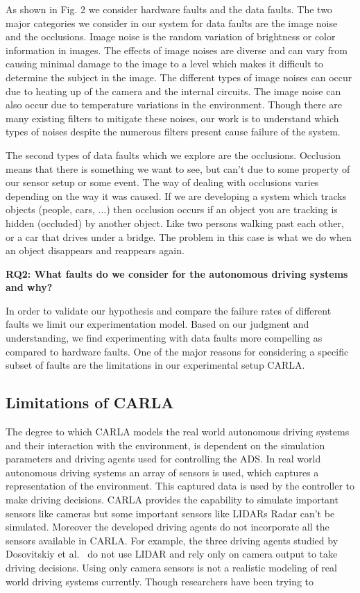 As shown in Fig. 2 we consider hardware faults and the data faults. The two major categories we consider in our system for data faults are the image noise and the occlusions. Image noise is the random variation of brightness or color information in images.
The effects of image noises are diverse and can vary from causing minimal damage to the image to
a level which makes it difficult to determine the subject in the image. The different types of image noises can occur due to heating up of the camera and the internal circuits. The image noise can also occur due to temperature variations in the environment. Though there are many existing filters to mitigate these noises, our work is to understand which types of noises despite the numerous filters present cause failure of the system. 

The second types of data faults which we explore are the occlusions. Occlusion means that there is something we want to see, but can't due to some property of our sensor setup or some event. The way of dealing with occlusions varies depending on the way it was caused. If we are developing a system which tracks objects (people, cars, ...) then occlusion occurs if an object you are tracking is hidden (occluded) by another object. Like two persons walking past each other, or a car that drives under a bridge. The problem in this case is what we do when an object disappears and reappears again.

\textbf{RQ2: What faults do we consider for the autonomous driving systems and why?}

In order to validate our hypothesis and compare the failure rates of different faults we limit our experimentation model. Based on our judgment and understanding, we find experimenting with data faults more compelling as compared to hardware faults. One of the major reasons for considering a specific subset of faults are the limitations in our experimental setup CARLA.

\subsection{Limitations of CARLA}
The degree to which CARLA models the real world autonomous driving systems and their interaction with the environment, is dependent on the simulation parameters and driving agents used for controlling the ADS. In real world autonomous driving systems an array of sensors is used, which captures a representation of the environment. This captured data is used by the controller to make driving decisions. CARLA provides the capability to simulate important sensors like cameras  but some important sensors like LIDARs Radar can't be simulated. Moreover the developed driving agents do not incorporate all the sensors available in CARLA. For example, the three driving agents studied by Dosovitskiy et al.~\cite{Dosovitskiy17} do not use LIDAR and rely only on camera output to take driving decisions. Using only camera sensors is not a realistic modeling of real world driving systems currently. Though researchers have been trying to 

